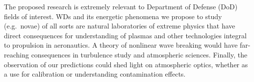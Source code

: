 \documentclass[11pt,
        usenames, %
        dvipsnames %
    ]{article}
\begin{document}
The proposed research is extremely relevant to Department of Defense (DoD)
fields of interest. WDs and its energetic phenomena we propose to study (e.g.\
novae) of all sorts are natural laboratories of extreme physics that have
direct consequences for understanding of plasmas and other technologies integral
to propulsion in aeronautics. A theory of nonlinear wave breaking would have
far-reaching consequences in turbulence study and atmospheric sciences. Finally,
the observation of our predictions could shed light on atmospheric optics,
whether as a use for calibration or understanding contamination effects.


\renewcommand{\bibname}{References}
{\scriptsize }
\end{document}
